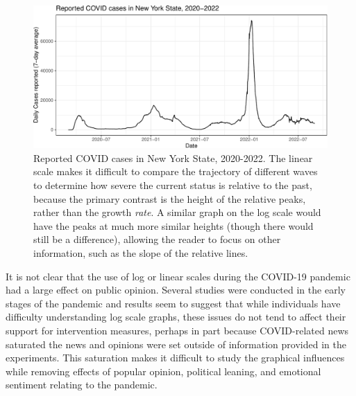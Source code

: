 \documentclass[article]{jdssv}\usepackage[]{graphicx}\usepackage[]{xcolor} %
\newenvironment{knitrout}{}{} %
\begin{document}
\begin{knitrout}\footnotesize
{}\color{fgcolor}\begin{figure}

{\centering \includegraphics[width=.8\linewidth]{Figures_R/fig-linear-scales-ref-lines-1} 

}

\caption[Reported COVID cases in New York State, 2020-2022]{Reported COVID cases in New York State, 2020-2022. The linear scale makes it difficult to compare the trajectory of different waves to determine how severe the current status is relative to the past, because the primary contrast is the height of the relative peaks, rather than the growth \emph{rate}. A similar graph on the log scale would have the peaks at much more similar heights (though there would still be a difference), allowing the reader to focus on other information, such as the slope of the relative lines.}\label{fig:linear-scales-ref-lines}
\end{figure}

\end{knitrout}



It is not clear that the use of log or linear scales during the COVID-19 pandemic had a large effect on public opinion. Several studies were conducted in the early stages of the pandemic \citep{romanoScaleCOVID19Graphs2020, seviLogarithmicLinearVisualizations2020, ryanGraphsLogarithmicAxes2020} and results seem to suggest that while individuals have difficulty understanding log scale graphs, these issues do not tend to affect their support for intervention measures, perhaps in part because COVID-related news saturated the news and opinions were set outside of information provided in the experiments. This saturation makes it difficult to study the graphical influences while removing effects of popular opinion, political leaning, and emotional sentiment relating to the pandemic. 
\end{document}
